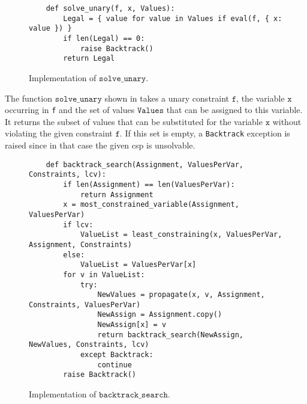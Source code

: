 \begin{figure}[!ht]
\centering
\begin{verbatim}
    def solve_unary(f, x, Values):
        Legal = { value for value in Values if eval(f, { x: value }) }
        if len(Legal) == 0:
            raise Backtrack()
        return Legal
\end{verbatim}
\vspace*{-0.3cm}
\caption{Implementation of $\texttt{solve\_unary}$.}
\label{fig:Constraint-Propagation-Solver.ipynb:solve_unary}
\end{figure}

The function $\texttt{solve\_unary}$ shown in  takes a unary
constraint $\texttt{f}$, the variable $\texttt{x}$ occurring in \texttt{f} and the set of values $\texttt{Values}$ that can be assigned to this
variable.  It returns the subset of values that can be substituted for the variable $\texttt{x}$
without violating the given constraint $\texttt{f}$.  If this set is empty, a \texttt{Backtrack} exception is
raised since in that case the given \ac{csp} is unsolvable.


\begin{figure}[!ht]
\centering
\begin{verbatim}
    def backtrack_search(Assignment, ValuesPerVar, Constraints, lcv):
        if len(Assignment) == len(ValuesPerVar):
            return Assignment
        x = most_constrained_variable(Assignment, ValuesPerVar)
        if lcv:
            ValueList = least_constraining(x, ValuesPerVar, Assignment, Constraints)
        else:
            ValueList = ValuesPerVar[x]
        for v in ValueList: 
            try:
                NewValues = propagate(x, v, Assignment, Constraints, ValuesPerVar)
                NewAssign = Assignment.copy()
                NewAssign[x] = v
                return backtrack_search(NewAssign, NewValues, Constraints, lcv)
            except Backtrack:
                continue
        raise Backtrack()
\end{verbatim}
\vspace*{-0.3cm}
\caption{Implementation of $\texttt{backtrack\_search}$.}
\label{fig:Constraint-Propagation-Solver.ipynb:backtrack_search}
\end{figure}

